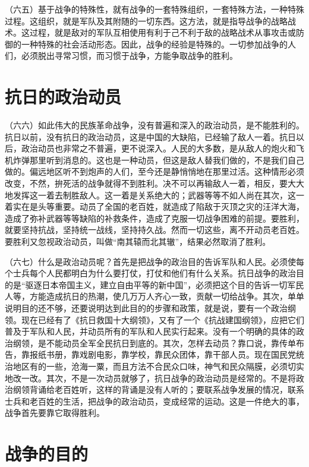 （六五）基于战争的特殊性，就有战争的一套特殊组织，一套特殊方法，一种特殊过程。这组织，就是军队及其附随的一切东西。这方法，就是指导战争的战略战术。这过程，就是敌对的军队互相使用有利于己不利于敌的战略战术从事攻击或防御的一种特殊的社会活动形态。因此，战争的经验是特殊的。一切参加战争的人们，必须脱出寻常习惯，而习惯于战争，方能争取战争的胜利。

\section{抗日的政治动员}

（六六）如此伟大的民族革命战争，没有普遍和深入的政治动员，是不能胜利的。抗日以前，没有抗日的政治动员，这是中国的大缺陷，已经输了敌人一着。抗日以后，政治动员也非常之不普遍，更不说深入。人民的大多数，是从敌人的炮火和飞机炸弹那里听到消息的。这也是一种动员，但这是敌人替我们做的，不是我们自己做的。偏远地区听不到炮声的人们，至今还是静悄悄地在那里过活。这种情形必须改变，不然，拚死活的战争就得不到胜利。决不可以再输敌人一着，相反，要大大地发挥这一着去制胜敌人。这一着是关系绝大的；武器等等不如人尚在其次，这一着实在是头等重要。动员了全国的老百姓，就造成了陷敌于灭顶之灾的汪洋大海，造成了弥补武器等等缺陷的补救条件，造成了克服一切战争困难的前提。要胜利，就要坚持抗战，坚持统一战线，坚持持久战。然而一切这些，离不开动员老百姓。要胜利又忽视政治动员，叫做“南其辕而北其辙”，结果必然取消了胜利。

（六七）什么是政治动员呢？首先是把战争的政治目的告诉军队和人民。必须使每个士兵每个人民都明白为什么要打仗，打仗和他们有什么关系。抗日战争的政治目的是“驱逐日本帝国主义，建立自由平等的新中国”，必须把这个目的告诉一切军民人等，方能造成抗日的热潮，使几万万人齐心一致，贡献一切给战争。其次，单单说明目的还不够，还要说明达到此目的的步骤和政策，就是说，要有一个政治纲领。现在已经有了《抗日救国十大纲领》，又有了一个《抗战建国纲领》，应把它们普及于军队和人民，并动员所有的军队和人民实行起来。没有一个明确的具体的政治纲领，是不能动员全军全民抗日到底的。其次，怎样去动员？靠口说，靠传单布告，靠报纸书册，靠戏剧电影，靠学校，靠民众团体，靠干部人员。现在国民党统治地区有的一些，沧海一粟，而且方法不合民众口味，神气和民众隔膜，必须切实地改一改。其次，不是一次动员就够了，抗日战争的政治动员是经常的。不是将政治纲领背诵给老百姓听，这样的背诵是没有人听的；要联系战争发展的情况，联系士兵和老百姓的生活，把战争的政治动员，变成经常的运动。这是一件绝大的事，战争首先要靠它取得胜利。

\section{战争的目的}

